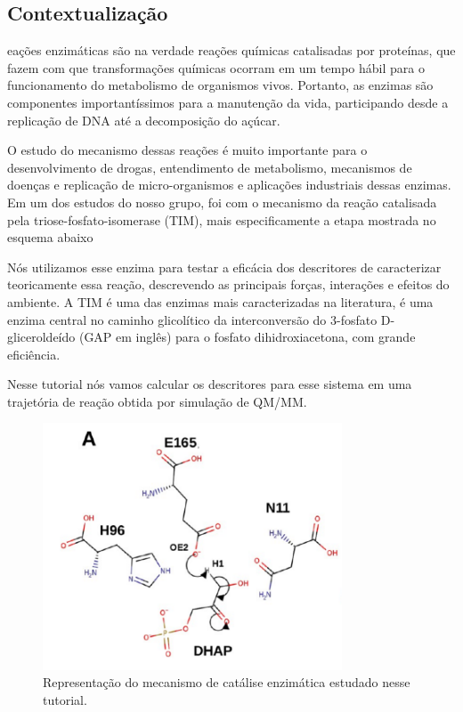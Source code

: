 \documentclass[a4paper,11pt]{refart}
\begin{document}
\subsection{Contextualização}

eações enzimáticas são na verdade reações químicas catalisadas por proteínas, que fazem com que transformações químicas ocorram em um tempo hábil para o funcionamento do metabolismo de organismos vivos. Portanto, as enzimas são componentes importantíssimos para a manutenção da vida, participando desde a replicação de DNA até a decomposição do açúcar.

O estudo do mecanismo dessas reações é muito importante para o desenvolvimento de drogas, entendimento de metabolismo, mecanismos de doenças e replicação de micro-organismos e aplicações industriais dessas enzimas. Em um dos estudos do nosso grupo, foi com o mecanismo da reação catalisada pela triose-fosfato-isomerase (TIM), mais especificamente a etapa mostrada no esquema abaixo

Nós utilizamos esse enzima para testar a eficácia dos descritores de caracterizar teoricamente essa reação, descrevendo as principais forças, interações e efeitos do ambiente. A TIM é uma das enzimas mais caracterizadas na literatura, é uma enzima central no caminho glicolítico da interconversão do 3-fosfato D-gliceroldeído (GAP em inglês) para o fosfato dihidroxiacetona, com grande eficiência.

Nesse tutorial nós vamos calcular os descritores para esse sistema em uma trajetória de reação obtida por simulação de QM/MM.

\hspace*{-\leftmarginwidth}
\begin{minipage}{\fullwidth}
	\begin{figure}[H]
		\begin{center}
			\includegraphics[width=3.5in]{images/tut6_img0}
			\caption{Representação do mecanismo de catálise enzimática estudado nesse tutorial.}
			\label{fig_tut6_0}
		\end{center}
	\end{figure}
\end{minipage}
\end{document}
